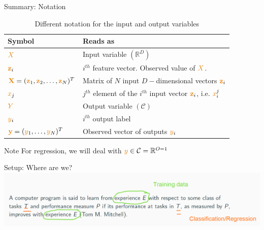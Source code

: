 \documentclass[aspectratio=169,10pt]{beamer}
\begin{document}
\begin{frame}{Summary: Notation}
	
	\begin{table}
		\begin{tabular}{|l | l | }
			\hline
			Symbol & Reads as \\
			\hline \hline
			$\bigX$ & Input variable $(\mathbb{R}^D)$ \\ 
			$\boldx_i$ & $i^{th}$ feature vector.  Observed value of $\bigX$.  \\
			$\mathbf{\bigx}=(\boldx_1,\boldx_2, \ldots, \boldx_N)^T$ & Matrix of $N$ input $D-$dimensional vectors $\boldx_i$\\
			$\smallx_{j}$ & $j^{th}$ element of the $i^{th}$ input vector $\boldx_i$, i.e. $\smallx_i^j$ \\ 
			$\bigy$ & Output variable  $(\mathcal{C})$\\ 
			$\smally_i$ & $i^{th}$ output label\\ 
			$\boldy=(\smally_1, \ldots, \smally_N)^T$ & Observed vector of outputs $\smally_i$\\
			\hline
		\end{tabular}
		\caption{Different notation for the input and output variables}
	\end{table}
	\begin{alertblock}{Note}
		For regression, we will deal with $\smally \in \mathcal{C} =\mathbb{R}^{O=1}$
	\end{alertblock}
\end{frame}

\begin{frame}{Setup: Where are we?}
	\centering
		\includegraphics[width=\textwidth, clip]{images/setup_1}
\end{frame}
\end{document}
